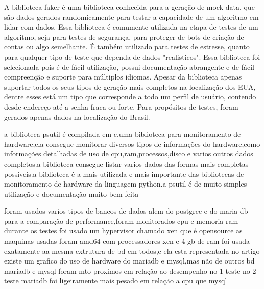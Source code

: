 \documentclass[
	12pt,				%
	openright,			%
	oneside,			%
	a4paper,			%
	english,			%
	french,				%
	spanish,			%
	brazil,				%
	]{abntex2}
\begin{document}
A biblioteca faker é uma biblioteca conhecida para a geração de mock data, que são dados gerados randomicamente para testar a capacidade de um algoritmo em lidar com dados. Essa biblioteca é comumente utilizada na etapa de testes de um algoritmo, seja para testes de segurança, para proteger de bots de criação de contas ou algo semelhante. É também utilizado para testes de estresse, quanto para qualquer tipo de teste que dependa de dados "realisticos".\newline
Essa biblioteca foi selecionada pois é de fácil utilização, possui documentação abrangente e de fácil compreenção e suporte para múltiplos idiomas. Apesar da biblioteca apenas suportar todos os seus tipos de geração mais completos na localização dos EUA, dentre esses está um tipo que corresponde a todo um perfil de usuário, contendo desde endereço até a senha fraca ou forte. Para propósitos de testes, foram gerados apenas dados na localização do Brasil.\newline
\cite{faker}

a biblioteca psutil é compilada em c,uma biblioteca para monitoramento de hardware,ela consegue monitorar diversos tipos de informações do hardware,como informações detalhadas de uso de cpu,ram,processos,disco e varios outros dados completos.a biblioteca consegue listar varios dados das formas mais completas possiveis.a biblioteca é a mais utilizada e mais importante das bibliotecas de monitoramento de hardware da linguagem python.a psutil é de muito simples utilização e documentação muito bem feita
\cite{psutil}


foram usados varios tipos de bancos de dados alem do postgree e do maria db para a comparação de performance,foram monitorados cpu e memoria ram
durante os testes foi usado um hypervisor chamado xen que é opensource
as maquinas usadas foram amd64 com processadores xen e 4 gb de ram
foi usada exatamente aa mesma extrutura de bd em todos,e ela esta representada no artigo
existe um grafico do uso de hardware do mariadb e mysql,mas não de outros bd
mariadb e mysql foram mto proximos em relação ao desempenho no 1 teste
no 2 teste mariadb foi ligeiramente mais pesado em relação a cpu que mysql
\cite{MariaDBMySQLOLTP}
\end{document}
